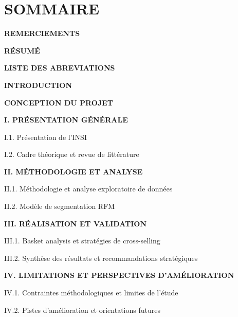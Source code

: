 \documentclass[a4paper,12pt]{article}
\begin{document}
\chapter*{SOMMAIRE}
\vspace{0.5cm}
{\large
\textbf{REMERCIEMENTS}\par

\vspace{0.25cm}
\textbf{RÉSUMÉ}\par

\vspace{0.25cm}
\textbf{LISTE DES ABREVIATIONS}\par

\vspace{0.25cm}
\textbf{INTRODUCTION}\par

\vspace{0.25cm}
\textbf{CONCEPTION DU PROJET}\par

\vspace{0.5cm}

\hspace*{1.3cm}\textbf{I. PRÉSENTATION GÉNÉRALE}\par
\hspace*{1.8cm}I.1. Présentation de l’INSI\par
\hspace*{1.8cm}I.2. Cadre théorique et revue de littérature\par

\vspace{0.25cm}

\hspace*{1.3cm}\textbf{II. MÉTHODOLOGIE ET ANALYSE}\par
\hspace*{1.8cm}II.1. Méthodologie et analyse exploratoire de données\par
\hspace*{1.8cm}II.2. Modèle de segmentation RFM\par

\vspace{0.25cm}

\hspace*{1.3cm}\textbf{III. RÉALISATION ET VALIDATION}\par
\hspace*{1.8cm}III.1. Basket analysis et stratégies de cross-selling\par
\hspace*{1.8cm}III.2. Synthèse des résultats et recommandations stratégiques\par

\vspace{0.25cm}

\hspace*{1.3cm}\textbf{IV. LIMITATIONS ET PERSPECTIVES D’AMÉLIORATION}\par
\hspace*{1.8cm}IV.1. Contraintes méthodologiques et limites de l’étude\par
\hspace*{1.8cm}IV.2. Pistes d’amélioration et orientations futures\par
}
\end{document}
